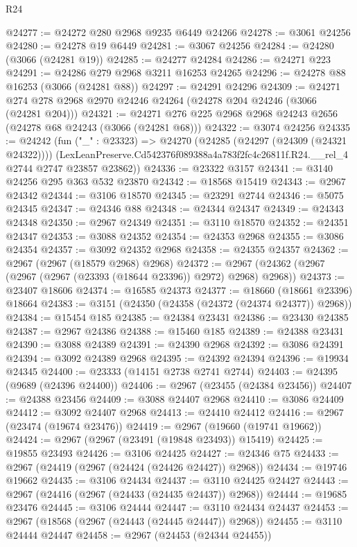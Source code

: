 \begin{lexlean}{R24}
\begin{coremodule}
@24277 := @24272 @280 @2968 @9235 @6449 @24266
@24278 := @3061 @24256
@24280 := @24278 @19 @6449
@24281 := @3067 @24256
@24284 := @24280 (@3066 (@24281 @19))
@24285 := @24277 @24284
@24286 := @24271 @223
@24291 := @24286 @279 @2968 @3211 @16253 @24265
@24296 := @24278 @88 @16253 (@3066 (@24281 @88))
@24297 := @24291 @24296
@24309 := @24271 @274 @278 @2968 @2970 @24246 @24264 (@24278 @204 @24246 (@3066 (@24281 @204)))
@24321 := @24271 @276 @225 @2968 @2968 @24243 @2656 (@24278 @68 @24243 (@3066 (@24281 @68)))
@24322 := @3074 @24256
@24335 := @24242
    (fun ("_" : @23323) =>
    @24270
      (@24285 (@24297 (@24309 (@24321 @24322))))
      (LexLeanPreserve.Cd542376f089388a4a783f2fc4c26811f.R24.__rel_4 @2744 @2747 @23857 @23862))
@24336 := @23322 @3157
@24341 := @3140 @24256 @295 @363 @532 @23870
@24342 := @18568 @15419
@24343 := @2967 @24342
@24344 := @3106 @18570
@24345 := @23291 @2744
@24346 := @5075 @24345
@24347 := @24346 @88
@24348 := @24344 @24347
@24349 := @24343 @24348
@24350 := @2967 @24349
@24351 := @3110 @18570
@24352 := @24351 @24347
@24353 := @3088 @24352
@24354 := @24353 @2968
@24355 := @3086 @24354
@24357 := @3092 @24352 @2968
@24358 := @24355 @24357
@24362 := @2967 (@2967 (@18579 @2968) @2968)
@24372 := @2967 (@24362 (@2967 (@2967 (@2967 (@23393 (@18644 @23396)) @2972) @2968) @2968))
@24373 := @23407 @18606
@24374 := @16585 @24373
@24377 := @18660 (@18661 @23396) @18664
@24383 := @3151 (@24350 (@24358 (@24372 (@24374 @24377)) @2968))
@24384 := @15454 @185
@24385 := @24384 @23431
@24386 := @23430 @24385
@24387 := @2967 @24386
@24388 := @15460 @185
@24389 := @24388 @23431
@24390 := @3088 @24389
@24391 := @24390 @2968
@24392 := @3086 @24391
@24394 := @3092 @24389 @2968
@24395 := @24392 @24394
@24396 := @19934 @24345
@24400 := @23333 (@14151 @2738 @2741 @2744)
@24403 := @24395 (@9689 (@24396 @24400))
@24406 := @2967 (@23455 (@24384 @23456))
@24407 := @24388 @23456
@24409 := @3088 @24407 @2968
@24410 := @3086 @24409
@24412 := @3092 @24407 @2968
@24413 := @24410 @24412
@24416 := @2967 (@23474 (@19674 @23476))
@24419 := @2967 (@19660 (@19741 @19662))
@24424 := @2967 (@2967 (@23491 (@19848 @23493)) @15419)
@24425 := @19855 @23493
@24426 := @3106 @24425
@24427 := @24346 @75
@24433 := @2967 (@24419 (@2967 (@24424 (@24426 @24427)) @2968))
@24434 := @19746 @19662
@24435 := @3106 @24434
@24437 := @3110 @24425 @24427
@24443 := @2967 (@24416 (@2967 (@24433 (@24435 @24437)) @2968))
@24444 := @19685 @23476
@24445 := @3106 @24444
@24447 := @3110 @24434 @24437
@24453 := @2967 (@18568 (@2967 (@24443 (@24445 @24447)) @2968))
@24455 := @3110 @24444 @24447
@24458 := @2967 (@24453 (@24344 @24455))

\end{coremodule}
\end{lexlean}
